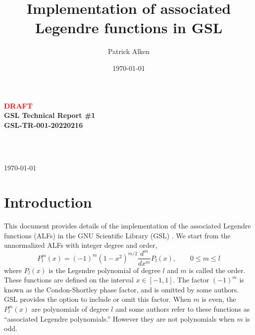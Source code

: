 \documentclass[12pt]{article}
\title{Implementation of associated Legendre functions in GSL}
\author{Patrick Alken}
\date{\today}
\begin{document}
\begin{titlepage}

\thispagestyle{fancy}
\renewcommand{\headrulewidth}{0pt}
\cfoot{}

\begin{center}

\LARGE{\textbf{\textcolor{red}{DRAFT}}}\\
\LARGE{\textbf{GSL Technical Report \#1}}\\
\Large{\textbf{GSL-TR-001-20220216}}\\

\vspace{5 mm}

\Large{\color{HeadColor}{\textbf{\@title}}}\\

\vspace{5 mm}

\small{\@author}\\

\small{\today}

\setcounter{tocdepth}{1}

\tableofcontents

\end{center}

\end{titlepage}

\rfoot{\today \quad \textbar \quad {\bf \thepage}}

\pagestyle{fancy}
\fancyhf{}
\rfoot{\today \quad \textbar \quad {\bf \thepage}}
\renewcommand{\headrulewidth}{2pt}

\setcounter{page}{1}
\newpage

\section{Introduction}

This document provides details of the implementation of the
associated Legendre functions (ALFs) in the GNU Scientific
Library (GSL) \citep{GSL}. We start from the
unnormalized ALFs with integer degree and order,
\begin{equation}
P_l^m(x) = (-1)^m \left(1 - x^2 \right)^{m/2} \frac{d^m}{dx^m} P_l(x), \qquad 0 \leq m \leq l
\label{eqn:Plmdef}
\end{equation}
where $P_l(x)$ is the Legendre polynomial of degree $l$ and $m$ is
called the order. These functions are defined on the interval
$x \in [-1,1]$. The factor $(-1)^m$ is known as the Condon-Shortley
phase factor, and is omitted by some authors. GSL provides the option
to include or omit this factor. When $m$ is even, the $P_l^m(x)$ are
polynomials of degree $l$ and some authors refer to these functions
as ``associated Legendre polynomials.'' However they are not polynomials
when $m$ is odd.
\end{document}
